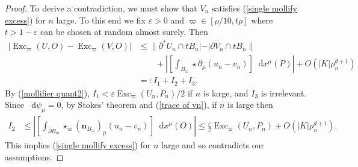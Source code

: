 \documentclass[reqno,11pt]{amsart}
\DeclareMathOperator{\Exc}{Exc}
\newcommand*\dif{\mathop{}\!\mathrm{d}}
\newcommand{\normal}{\mathbf n}
\theoremstyle{definition}
\numberwithin{equation}{section}
\begin{document}
\begin{proof}
To derive a contradiction, we must show that $V_n$ satisfies (\ref{single mollify excess}) for $n$ large.
To this end we fix $\varepsilon > 0$ and $\varpi \in [\rho/10, t\rho]$ where $t > 1 - \varepsilon$ can be chosen at random almost surely.
Then
\begin{align*}
    |\Exc_\varpi(U, O) - \Exc_\varpi(V, O)|
    &\leq \|\partial^* U_n \cap t B_n| - |\partial V_n \cap t B_n\|\\
    &\qquad + \left|\left[\int_{B_\varpi} \star \partial_\mu(u_n - v_n) \right] \dif x^\mu(P)\right| + O(|K| \rho_n^{d + 1}) \\
    &=: I_1 + I_2 + I_3.
\end{align*}
By (\ref{mollifier quant2}), $I_1 < \varepsilon \Exc_\varpi(U_n, P_n)/2$ if $n$ is large, and $I_3$ is irrelevant.
Since $\dif \psi_\mu = 0$, by Stokes' theorem and (\ref{trace of vn}), if $n$ is large then
\begin{align*}
    I_2 &\leq \left|\left[\int_{\partial B_\varpi} \star_\varpi (\normal_{B_\varpi})_\mu (u_n - v_n)\right] \dif x^\mu(O)\right| \leq \frac{\varepsilon}{2} \Exc_\varpi(U_n, P_n) + O(|K| \rho_n^{d + 1}).
\end{align*}
This implies (\ref{single mollify excess}) for $n$ large and so contradicts our assumptions.
\end{proof}
\end{document}
